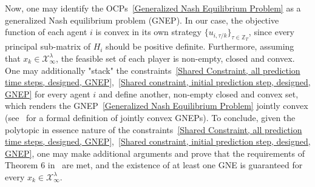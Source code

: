 \documentclass[letterpaper, 10 pt, conference]{ieeeconf}  %
\newcommand{\Z}{\mathbb{Z}}
\newcommand{\mc}[1]{\mathcal{#1}}
\begin{document}
Now, one may identify the OCPs~\eqref{Generalized Nash Equilibrium Problem} as a generalized Nash equilibrium problem (GNEP). In our case, the objective function of each agent $i$ is convex in its own strategy $\{u_{i,\tau/k}\}_{\tau \in \Z_{T}}$, since every principal sub-matrix of $H_{i}$ should be positive definite. Furthermore, assuming that $x_{k} \in \mc{X}^{\lambda}_{\infty}$, the feasible set of each player is non-empty, closed and convex. One may additionally "stack" the constraints~\eqref{Shared Constraint, all prediction time steps, designed, GNEP},~\eqref{Shared constraint, initial prediction step, designed, GNEP} for every agent $i$ and define another, non-empty closed and convex set, which renders the GNEP~\eqref{Generalized Nash Equilibrium Problem} jointly convex (see~\cite{Facchinei2010gnep} for a formal definition of jointly convex GNEPs).
To conclude, given the polytopic in essence nature of the constraints~\eqref{Shared Constraint, all prediction time steps, designed, GNEP},~\eqref{Shared constraint, initial prediction step, designed, GNEP}, one may make additional arguments and prove that the requirements of Theorem 6 in~\cite{Facchinei2010gnep} are met, and the existence of at least one GNE is guaranteed for every $x_{k} \in \mc{X}^{\lambda}_{\infty}$.
\end{document}
